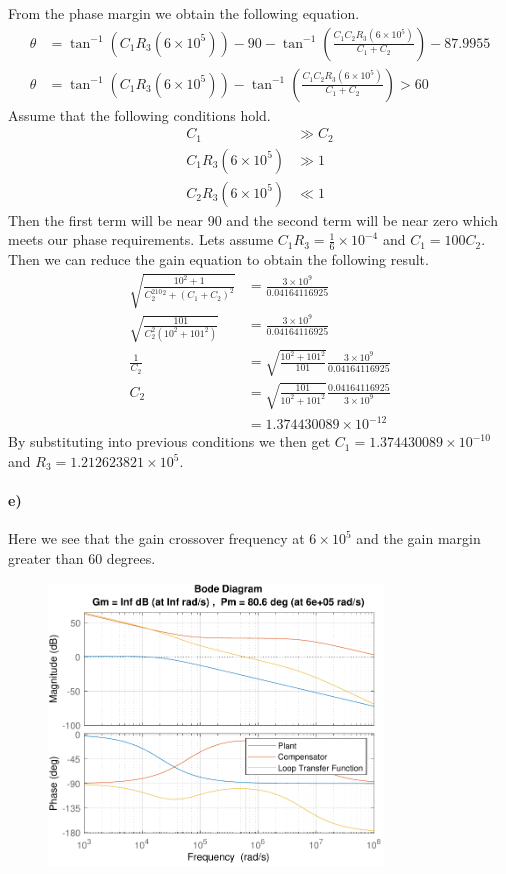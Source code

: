 \documentclass[12pt]{article}
\begin{document}
From the phase margin we obtain the following equation.
\begin{align*}
    \theta &= \tan^{-1}(C_1R_3(6\times 10^5))-90-\tan^{-1}\left(\frac{C_1C_2R_3(6\times 10^5)}{C_1+C_2}\right)-87.9955\\
    \theta &= \tan^{-1}(C_1R_3(6\times 10^5))-\tan^{-1}\left(\frac{C_1C_2R_3(6\times 10^5)}{C_1+C_2}\right) > 60
\end{align*}
Assume that the following conditions hold.
\begin{align*}
    C_1 &\gg C_2\\
    C_1R_3(6\times 10^5) &\gg 1\\
    C_2R_3(6\times 10^5) &\ll 1
\end{align*}
Then the first term will be near 90 and the second term will be near zero which meets our phase requirements.
Lets assume \(C_1R_3 = \frac{1}{6} \times 10^{-4}\) and \(C_1 = 100C_2\). Then we can reduce the gain
equation to obtain the following result.
\begin{align*}
    \sqrt{\frac{10^2 + 1}{C_2^210^2 + (C_1 + C_2)^2}}&=\frac{3\times10^9}{0.04164116925}\\
    \sqrt{\frac{101}{C_2^2(10^2+101^2)}}&=\frac{3\times10^9}{0.04164116925}\\
    \frac{1}{C_2}&=\sqrt{\frac{10^2+101^2}{101}}\frac{3\times10^9}{0.04164116925}\\
    C_2&=\sqrt{\frac{101}{10^2+101^2}}\frac{0.04164116925}{3\times10^9}\\
    &=1.374430089\times 10^{-12}
\end{align*}
By substituting into previous conditions we then get \(C_1=1.374430089\times 10^{-10}\) and \(R_3=1.212623821\times10^5\).

\paragraph{e)}

Here we see that the gain crossover frequency at \(6\times10^5\) and the gain margin greater than \(60\) degrees.
\begin{figure}[H]
    \begin{center}
        \includegraphics[width=3.5in]{CurrentControl-e.pdf}
    \end{center}
\end{figure}
\end{document}
